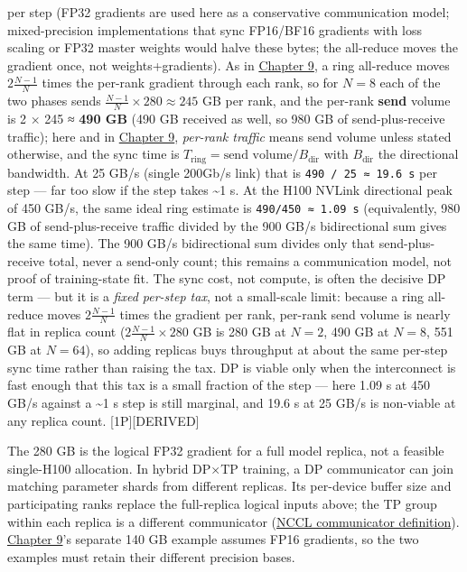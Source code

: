 per step (FP32 gradients are used here as a conservative communication
model; mixed-precision implementations that sync FP16/BF16 gradients
with loss scaling or FP32 master weights would halve these bytes; the
all-reduce moves the gradient once, not weights+gradients). As in
\hyperref[chap:9]{Chapter 9}, a ring all-reduce moves \(2\frac{N-1}{N}\) times the per-rank
gradient through each rank, so for \(N=8\) each of the two phases sends
\(\frac{N-1}{N} \times 280 \approx 245\) GB per rank, and the per-rank
\textbf{send} volume is 2 × 245 ≈ \textbf{490 GB} (490 GB received as
well, so 980 GB of send-plus-receive traffic); here and in \hyperref[chap:9]{Chapter 9},
\emph{per-rank traffic} means send volume unless stated otherwise, and
the sync time is \(T_\text{ring} = \text{send volume} / B_\text{dir}\)
with \(B_\text{dir}\) the directional bandwidth. At 25 GB/s (single
200Gb/s link) that is \texttt{490\ /\ 25\ ≈\ 19.6\ s} per step --- far
too slow if the step takes \textasciitilde1 s. At the H100 NVLink
directional peak of 450 GB/s, the same ideal ring estimate is
\texttt{490/450\ ≈\ 1.09\ s} (equivalently, 980 GB of send-plus-receive
traffic divided by the 900 GB/s bidirectional sum gives the same time).
The 900 GB/s bidirectional sum divides only that send-plus-receive
total, never a send-only count; this remains a communication model, not
proof of training-state fit. The sync cost, not compute, is often the
decisive DP term --- but it is a \emph{fixed per-step tax}, not a
small-scale limit: because a ring all-reduce moves \(2\frac{N-1}{N}\)
times the gradient per rank, per-rank send volume is nearly flat in
replica count (\(2\frac{N-1}{N}\times 280\) GB is 280 GB at \(N=2\), 490
GB at \(N=8\), 551 GB at \(N=64\)), so adding replicas buys throughput
at about the same per-step sync time rather than raising the tax. DP is
viable only when the interconnect is fast enough that this tax is a
small fraction of the step --- here 1.09 s at 450 GB/s against a
\textasciitilde1 s step is still marginal, and 19.6 s at 25 GB/s is
non-viable at any replica count. \mbox{{[}1P{]}}\hspace{0pt}\mbox{{[}DERIVED{]}}

The 280 GB is the logical FP32 gradient for a full model replica, not a
feasible single-H100 allocation. In hybrid DP×TP training, a DP
communicator can join matching parameter shards from different replicas.
Its per-device buffer size and participating ranks replace the
full-replica logical inputs above; the TP group within each replica is a
different communicator
(\href{https://docs.nvidia.com/deeplearning/nccl/user-guide/docs/usage/communicators.html}{NCCL
communicator definition}). \hyperref[chap:9]{Chapter 9}'s separate 140 GB example assumes
FP16 gradients, so the two examples must retain their different
precision bases.

